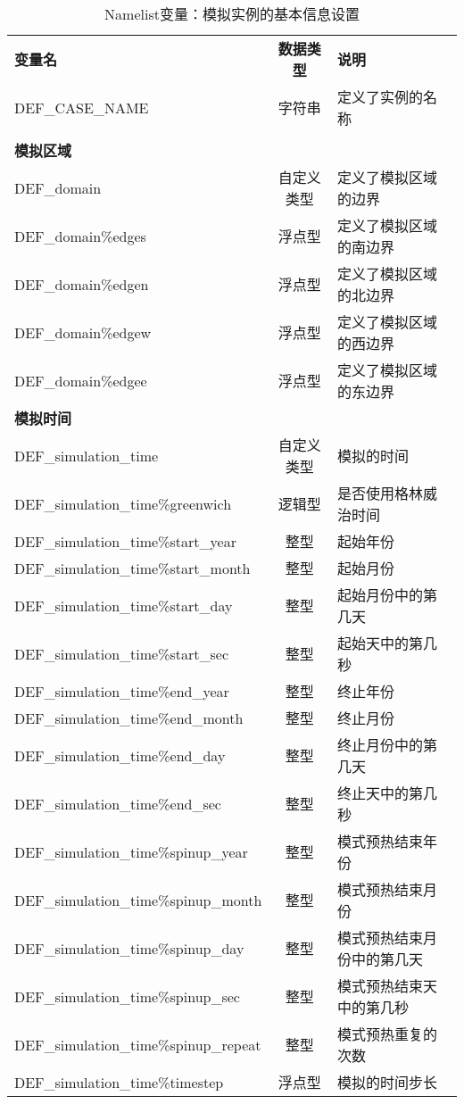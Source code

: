 \documentclass[a4paper,12pt,twoside]{article}
\begin{document}
\begin{table}[!htbp]
\caption{Namelist变量：模拟实例的基本信息设置} \label{table_nl_basic}
\centering \renewcommand{\arraystretch}{1.2}
\begin{tabular}{lcp{}}
\toprule
\textbf{变量名} & \textbf{数据类型} & \textbf{说明} \\
DEF\_CASE\_NAME & 字符串 & 定义了实例的名称 \\
 \\\midrule
\textbf{模拟区域} && \\
DEF\_domain & 自定义类型 & 定义了模拟区域的边界 \\
DEF\_domain\%edges & 浮点型 & 定义了模拟区域的南边界 \\
DEF\_domain\%edgen & 浮点型 & 定义了模拟区域的北边界 \\
DEF\_domain\%edgew & 浮点型 & 定义了模拟区域的西边界 \\
DEF\_domain\%edgee & 浮点型 & 定义了模拟区域的东边界 \\\midrule
\textbf{模拟时间} && \\
DEF\_simulation\_time & 自定义类型 & 模拟的时间 \\
DEF\_simulation\_time\%greenwich & 逻辑型 & 是否使用格林威治时间 \\
DEF\_simulation\_time\%start\_year & 整型 & 起始年份 \\
DEF\_simulation\_time\%start\_month & 整型 & 起始月份 \\
DEF\_simulation\_time\%start\_day & 整型 & 起始月份中的第几天 \\
DEF\_simulation\_time\%start\_sec & 整型 & 起始天中的第几秒 \\
DEF\_simulation\_time\%end\_year & 整型 & 终止年份 \\
DEF\_simulation\_time\%end\_month & 整型 & 终止月份 \\
DEF\_simulation\_time\%end\_day & 整型 & 终止月份中的第几天 \\
DEF\_simulation\_time\%end\_sec & 整型 & 终止天中的第几秒 \\
DEF\_simulation\_time\%spinup\_year & 整型 & 模式预热结束年份 \\
DEF\_simulation\_time\%spinup\_month & 整型 & 模式预热结束月份 \\
DEF\_simulation\_time\%spinup\_day & 整型 & 模式预热结束月份中的第几天 \\
DEF\_simulation\_time\%spinup\_sec & 整型 & 模式预热结束天中的第几秒 \\
DEF\_simulation\_time\%spinup\_repeat & 整型 & 模式预热重复的次数 \\
DEF\_simulation\_time\%timestep & 浮点型 & 模拟的时间步长 \\
\bottomrule
\end{tabular} 
\end{table}
\end{document}
